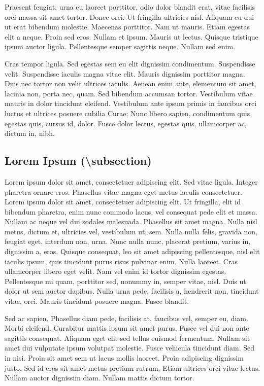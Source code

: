 \documentclass[nochapterpage,bigchapter,linedtoc,longdoc,colorback,accentcolor=tud4c]{tudreport}
\begin{document}
    Praesent feugiat, urna eu laoreet porttitor, odio dolor blandit erat, vitae facilisis orci massa sit amet tortor. Donec orci. Ut fringilla ultricies nisl. Aliquam eu dui ut erat bibendum molestie. Maecenas porttitor. Nam ut mauris. Etiam egestas elit a neque. Proin sed eros. Nullam et ipsum. Mauris ut lectus. Quisque tristique ipsum auctor ligula. Pellentesque semper sagittis neque. Nullam sed enim.

    Cras tempor ligula. Sed egestas sem eu elit dignissim condimentum. Suspendisse velit. Suspendisse iaculis magna vitae elit. Mauris dignissim porttitor magna. Duis nec tortor non velit ultrices iaculis. Aenean enim ante, elementum sit amet, lacinia non, porta nec, quam. Sed bibendum accumsan tortor. Vestibulum vitae mauris in dolor tincidunt eleifend. Vestibulum ante ipsum primis in faucibus orci luctus et ultrices posuere cubilia Curae; Nunc libero sapien, condimentum quis, egestas quis, cursus id, dolor. Fusce dolor lectus, egestas quis, ullamcorper ac, dictum in, nibh.

  \subsection{Lorem Ipsum (\textbackslash subsection)}

    Lorem ipsum dolor sit amet, consectetuer adipiscing elit. Sed vitae ligula. Integer pharetra ornare eros. Phasellus vitae magna eget metus iaculis consectetuer. Lorem ipsum dolor sit amet, consectetuer adipiscing elit. Ut fringilla, elit id bibendum pharetra, enim nunc commodo lacus, vel consequat pede elit et massa. Nullam ac neque vel dui sodales malesuada. Phasellus sit amet magna. Nulla nisl metus, dictum et, ultricies vel, vestibulum ut, sem. Nulla nulla felis, gravida non, feugiat eget, interdum non, urna. Nunc nulla nunc, placerat pretium, varius in, dignissim a, eros. Quisque consequat, leo sit amet adipiscing pellentesque, nisl elit iaculis ipsum, quis tincidunt purus risus pulvinar enim. Nulla laoreet. Cras ullamcorper libero eget velit. Nam vel enim id tortor dignissim egestas. Pellentesque mi quam, porttitor sed, nonummy in, semper vitae, nisl. Duis ut dolor ut sem auctor dapibus. Nulla urna pede, facilisis a, hendrerit non, tincidunt vitae, orci. Mauris tincidunt posuere magna. Fusce blandit.

    Sed ac sapien. Phasellus diam pede, facilisis at, faucibus vel, semper eu, diam. Morbi eleifend. Curabitur mattis ipsum sit amet purus. Fusce vel dui non ante sagittis consequat. Aliquam eget elit sed tellus euismod fermentum. Nullam sit amet dui vulputate ipsum volutpat molestie. Fusce vehicula tincidunt diam. Sed in nisi. Proin sit amet sem ut lacus mollis laoreet. Proin adipiscing dignissim justo. Sed id eros sit amet metus pretium rutrum. Etiam ultrices orci vitae lectus. Nullam auctor dignissim diam. Nullam mattis dictum tortor.
\end{document}
